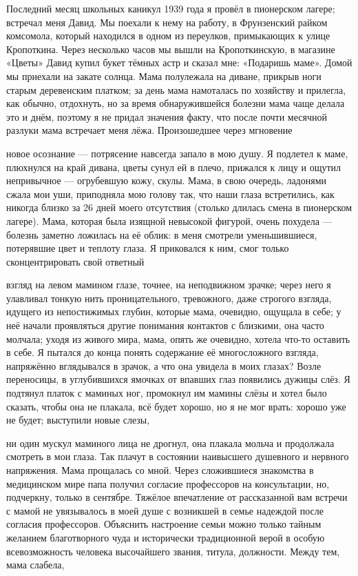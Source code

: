 \label{182-1}
Последний месяц школьных каникул 1939 года я провёл в пионерском лагере; встречал меня Давид. Мы поехали к нему на работу, в Фрунзенский райком комсомола, который находился в одном из переулков, примыкающих к улице Кропоткина. Через несколько часов мы вышли на Кропоткинскую, в магазине «Цветы» Давид купил букет тёмных астр и сказал мне: «Подаришь маме». Домой мы приехали на закате солнца. Мама полулежала на диване, прикрыв ноги старым деревенским платком; за день мама намоталась по хозяйству и прилегла, как обычно, отдохнуть, но за время обнаружившейся болезни мама чаще делала это и днём, поэтому я не придал значения факту, что после почти месячной разлуки мама встречает меня лёжа. Произошедшее через мгновение

\label{183-1}
новое осознание — потрясение навсегда запало в мою душу.
Я подлетел к маме, плюхнулся на край дивана, цветы сунул ей в плечо, прижался к лицу и ощутил непривычное — огрубевшую кожу, скулы. Мама, в свою очередь, ладонями сжала мои уши, приподняла мою голову так, что наши глаза встретились, как никогда близко за 26 дней моего отсутствия (столько длилась смена в пионерском лагере). Мама, которая была изящной невысокой фигурой, очень похудела — болезнь заметно ложилась на её облик: в меня смотрели уменьшившиеся, потерявшие цвет и теплоту глаза. Я приковался к ним, смог только сконцентрировать свой ответный

\label{184-1}
взгляд на левом мамином глазе, точнее, на неподвижном зрачке; через него я улавливал тонкую нить проницательного, тревожного, даже строгого взгляда, идущего из непостижимых глубин, которые мама, очевидно, ощущала в себе; у неё начали проявляться другие понимания контактов с близкими, она часто молчала; уходя из живого мира, мама, опять же очевидно, хотела что-то оставить в себе. Я пытался до конца понять содержание её многосложного взгляда, напряжённо вглядывался в зрачок, а что она увидела в моих глазах? Возле переносицы, в углубившихся ямочках от впавших глаз появились дужицы слёз. Я подтянул платок с маминых ног, промокнул им мамины слёзы и хотел было сказать, чтобы она не плакала, всё будет хорошо, но я не мог врать: хорошо уже не будет; выступили новые слезы,

\label{185-1}
ни один мускул маминого лица не дрогнул, она плакала мольча и продолжала смотреть в мои глаза. Так плачут в состоянии наивысшего душевного и нервного напряжения. Мама прощалась со мной.
Через сложившиеся знакомства в медицинском мире папа получил согласие профессоров на консультации, но, подчеркну, только в сентябре. Тяжёлое впечатление от рассказанной вам встречи с мамой не увязывалось в моей душе с возникшей в семье надеждой после согласия профессоров. Объяснить настроение семьи можно только тайным желанием благотворного чуда и исторически традиционной верой в особую всевозможность человека высочайшего звания, титула, должности. Между тем, мама слабела,

